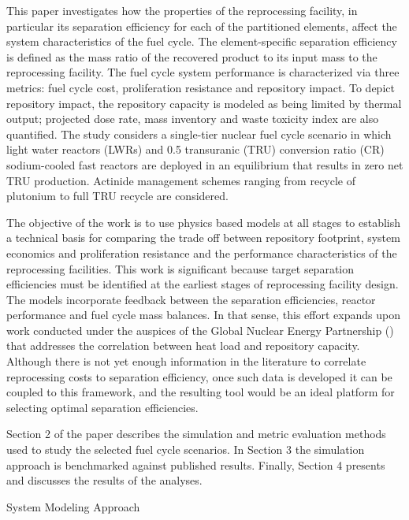This paper investigates how the properties of the reprocessing facility,
in particular its separation efficiency for each of the partitioned
elements, affect the system characteristics of the fuel cycle. The
element-specific separation efficiency is defined as the mass ratio of
the recovered product to its input mass to the reprocessing facility. 
The fuel cycle system performance is characterized via three metrics:
fuel cycle cost, proliferation resistance and repository impact.  To
depict repository impact, the repository capacity is modeled as being
limited by thermal output; projected dose rate, mass inventory and waste
toxicity index are also quantified.  The study considers a single-tier
nuclear fuel cycle scenario in which light water reactors (LWRs) and 0.5
transuranic (TRU) conversion ratio (CR) sodium-cooled fast reactors are
deployed in an equilibrium that results in zero net TRU production. 
Actinide management schemes ranging from recycle of plutonium to full
TRU recycle are considered.

The objective of the work is to use physics based models at all stages
to establish a technical basis for comparing the trade off between
repository footprint, system economics and proliferation resistance and
the performance characteristics of the reprocessing facilities.  This
work is significant because target separation efficiencies must be
identified at the earliest stages of reprocessing facility design.  The
models incorporate feedback between the separation efficiencies, reactor
performance and fuel cycle mass balances.  In that sense, this effort
expands upon work conducted under the auspices of the Global Nuclear
Energy Partnership () that addresses the correlation between heat load
and repository capacity.  Although there is not yet enough information
in the literature to correlate reprocessing costs to separation
efficiency, once such data is developed it can be coupled to this
framework, and the resulting tool would be an ideal platform for
selecting optimal separation efficiencies.

Section 2 of the paper describes the simulation and metric evaluation
methods used to study the selected fuel cycle scenarios.  In Section 3
the simulation approach is benchmarked against published results. 
Finally, Section 4 presents and discusses the results of the analyses.

System Modeling Approach

